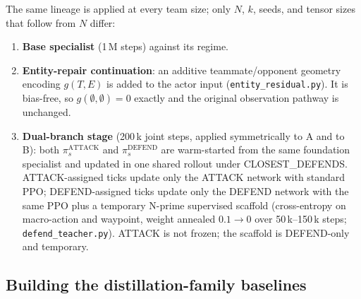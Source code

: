 The same lineage is applied at every team size; only \(N\), \(k\), seeds,
and tensor sizes that follow from \(N\) differ:
\begin{enumerate}
  \item \textbf{Base specialist} (1\,M steps) against its regime.
  \item \textbf{Entity-repair continuation}: an additive teammate/opponent
  geometry encoding \(g(T,E)\) is added to the actor input
  (\texttt{entity\_residual.py}). It is bias-free, so
  \(g(\emptyset,\emptyset)=0\) exactly and the original observation pathway
  is unchanged.
  \item \textbf{Dual-branch stage} (200\,k joint steps, applied symmetrically
  to A and to B): both \(\pi^{\mathrm{ATTACK}}_s\) and
  \(\pi^{\mathrm{DEFEND}}_s\) are warm-started from the same foundation
  specialist and updated in one shared rollout under CLOSEST\_DEFENDS.
  ATTACK-assigned ticks update only the ATTACK network with standard PPO;
  DEFEND-assigned ticks update only the DEFEND network with the same PPO
  plus a temporary N-prime supervised scaffold (cross-entropy on
  macro-action and waypoint, weight annealed \(0.1\to0\) over
  50\,k--150\,k steps; \texttt{defend\_teacher.py}). ATTACK is not frozen;
  the scaffold is DEFEND-only and temporary.
\end{enumerate}

\subsection{Building the distillation-family baselines}
\label{sec:method-distill}

